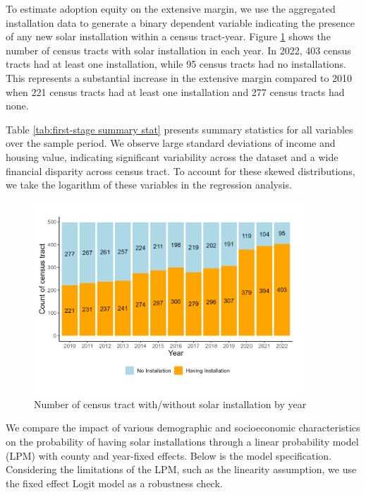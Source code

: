 \documentclass[12pt,twoside,letterpaper]{article}
\begin{document}
To estimate adoption equity on the extensive margin, we use the aggregated installation data to generate a binary dependent variable indicating the presence of any new solar installation within a census tract-year. Figure \ref{fig:stack_installation} shows the number of census tracts with solar installation in each year. In 2022, 403 census tracts had at least one installation, while 95 census tracts had no installations. This represents a substantial increase in the extensive margin compared to 2010 when 221 census tracts had at least one installation and 277 census tracts had none.

Table \ref{tab:first-stage summary stat} presents summary statistics for all variables over the sample period. We observe large standard deviations of income and housing value, indicating significant variability across the dataset and a wide financial disparity across census tract. To account for these skewed distributions, we take the logarithm of these variables in the regression analysis. 

\begin{figure}[!ht]
    \centering
\includegraphics[width=0.9\textwidth]{figures/stack_installation.png}
    \caption{Number of census tract with/without solar installation by year}
    \label{fig:stack_installation}
\end{figure}

We compare the impact of various demographic and socioeconomic characteristics on the probability of having solar installations through a linear probability model (LPM) with county and year-fixed effects. Below is the model specification. Considering the limitations of the LPM, such as the linearity assumption, we use the fixed effect Logit model as a robustness check.
\end{document}

